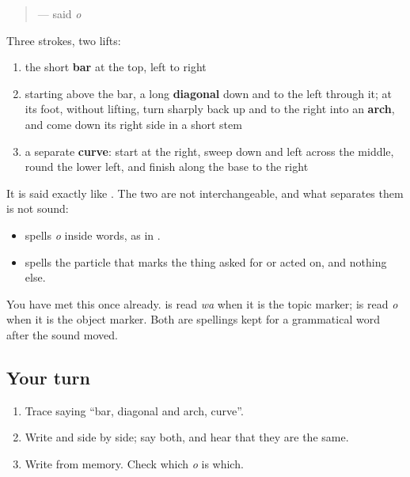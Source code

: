 \begin{quote}
\textbf{} — said \emph{o}
\end{quote}

Three strokes, two lifts:

\begin{enumerate}
\raggedright
  \item the short \textbf{bar} at the top, left to right
  \item starting above the bar, a long \textbf{diagonal} down and to the left through it; at its foot, without lifting, turn sharply back up and to the right into an \textbf{arch}, and come down its right side in a short stem
  \item a separate \textbf{curve}: start at the right, sweep down and left across the middle, round the lower left, and finish along the base to the right
\end{enumerate}

It is said exactly like \textbf{}. The two are not interchangeable, and what separates them is not sound:

\begin{itemize}
\raggedright
  \item \textbf{} spells \emph{o} inside words, as in \textbf{}.
  \item \textbf{} spells the particle that marks the thing asked for or acted on, and nothing else.
\end{itemize}

You have met this once already. \textbf{} is read \emph{wa} when it is the topic marker; \textbf{} is read \emph{o} when it is the object marker. Both are spellings kept for a grammatical word after the sound moved.

\subsection*{Your turn}
\begin{enumerate}
\raggedright
  \item Trace \textbf{} saying \textquotedblleft{}bar, diagonal and arch, curve\textquotedblright{}.
  \item Write \textbf{} and \textbf{} side by side; say both, and hear that they are the same.
  \item Write \textbf{ } from memory. Check which \emph{o} is which.
\end{enumerate}

